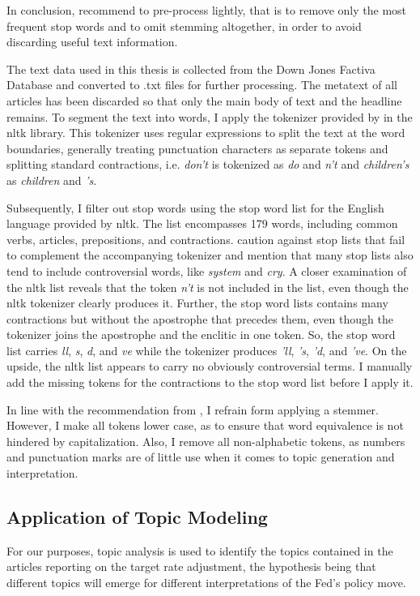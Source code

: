 \documentclass[11pt,a4paper,english,oneside]{book}
\numberwithin{equation}{chapter}
\begin{document}
In conclusion, \cite{Schofield.2017} recommend to pre-process lightly, that is to remove only the most frequent stop words and to omit stemming altogether, in order to avoid discarding useful text information. 

The text data used in this thesis is collected from the Down Jones Factiva Database and converted to .txt files for further processing. The metatext of all articles has been discarded so that only the main body of text and the headline remains. To segment the text into words, I apply the tokenizer provided by \cite{Bird.2010} in the nltk library. This tokenizer uses regular expressions to split the text at the word boundaries, generally treating punctuation characters as separate tokens and splitting standard contractions, i.e. \textit{don't} is tokenized as \textit{do} and \textit{n't} and \textit{children's} as \textit{children} and \textit{'s}. 

Subsequently, I filter out stop words using the stop word list for the English language provided by nltk. The list encompasses 179 words, including common verbs, articles, prepositions, and contractions. \citep[p. 8--9]{Nothman.2018} caution against stop lists that fail to complement the accompanying tokenizer and mention that many stop lists also tend to include controversial words, like \textit{system} and \textit{cry}. A closer examination of the nltk list reveals that the token \textit{n't} is not included in the list, even though the nltk tokenizer clearly produces it. Further, the stop word lists contains many contractions but without the apostrophe that precedes them, even though the tokenizer joins the apostrophe and the enclitic in one token. So, the stop word list carries \textit{ll}, \textit{s}, \textit{d}, and \textit{ve} while the tokenizer produces \textit{'ll}, \textit{'s}, \textit{'d}, and \textit{'ve}. On the upside, the nltk list appears to carry no obviously controversial terms. I manually add the missing tokens for the contractions to the stop word list before I apply it. 

In line with the recommendation from \cite{Schofield.2017}, I refrain form applying a stemmer. However, I make all tokens lower case, as to ensure that word equivalence is not hindered by capitalization. Also, I remove all non-alphabetic tokens, as numbers and punctuation marks are of little use when it comes to topic generation and interpretation. 

\subsection{Application of Topic Modeling}
For our purposes, topic analysis is used to identify the topics contained in the articles reporting on the target rate adjustment, the hypothesis being that different topics will emerge for different interpretations of the Fed's policy move. 
\end{document}
